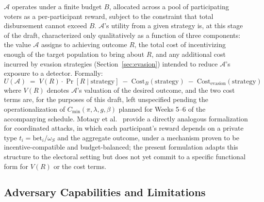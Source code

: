 \documentclass[journal,onecolumn,11pt]{IEEEtran}
\begin{document}
$\mathcal{A}$ operates under a finite budget $B$, allocated across a pool of
participating voters as a per-participant reward, subject to the constraint
that total disbursement cannot exceed $B$. $\mathcal{A}$'s utility from a
given strategy is, at this stage of the draft, characterized only
qualitatively as a function of three components: the value $\mathcal{A}$
assigns to achieving outcome $R$, the total cost of incentivizing enough of
the target population to bring about $R$, and any additional cost incurred by
evasion strategies (Section~\ref{sec:evasion}) intended to reduce
$\mathcal{A}$'s exposure to a detector. Formally:
\[
U(\mathcal{A}) \;=\; V(R) \cdot \Pr[R \mid \text{strategy}] \;-\; \text{Cost}_B(\text{strategy}) \;-\; \text{Cost}_{\text{evasion}}(\text{strategy})
\]
where $V(R)$ denotes $\mathcal{A}$'s valuation of the desired outcome, and the
two cost terms are, for the purposes of this draft, left unspecified pending
the operationalization of $C_{\min}(\pi, \lambda, g, \beta)$ planned for Weeks 5--6 of the accompanying schedule. Motaqy et al.~\cite{motaqy2021bet} provide a
directly analogous formalization for coordinated attacks, in which each
participant's reward depends on a private type $t_i = \text{bet}_i / \omega_S$
and the aggregate outcome, under a mechanism proven to be incentive-compatible
and budget-balanced; the present formulation adapts this structure to the
electoral setting but does not yet commit to a specific functional form for
$V(R)$ or the cost terms.

\subsection{Adversary Capabilities and Limitations}
\label{subsec:capabilities}
\end{document}
